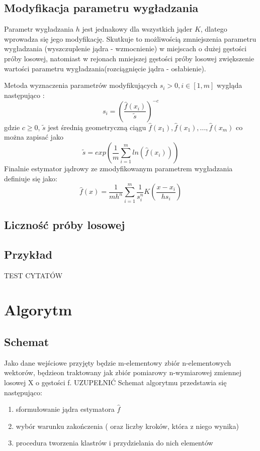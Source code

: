 \subsection{Modyfikacja parametru wygładzania}
\label{subsec:modyfikacje_h}
Parametr wygładzania $h$ jest jednakowy dla wszystkich jąder $K$, dlatego wprowadza się jego modyfikację. Skutkuje to możliwością zmniejszenia parametru wygładzania (wyszczuplenie jądra - wzmocnienie) w miejscach o dużej gęstości próby losowej, natomiast w rejonach mniejszej gęstości próby losowej zwiększenie wartości parametru wygładzania(rozciągnięcie jądra - osłabienie).

Metoda wyznaczenia parametrów modyfikujących $s_i>0, i \in [1, m]$ wygląda następująco :
\begin{equation}
s_i= {(\frac{\hat{f}(x_i)}{\tilde{s}})}^{-c}
\end{equation}
gdzie $c \geq 0$, $\tilde{s}$ jest średnią geometryczną ciągu $\hat{f}(x_1), \hat{f}(x_1), ..., \hat{f}(x_m)$ co można zapisać jako
\begin{equation}
\tilde{s} = exp(\frac{1}{m} \displaystyle\sum_{i=1}^{m} ln(\hat{f}(x_i)) )
\end{equation} 
Finalnie estymator jądrowy ze zmodyfikowanym parametrem wygładzania definiuje się jako:
\begin{equation}
\label{eq:est_mod}
\hat{f}(x)=\frac{1}{mh^n} \displaystyle \sum_{i=1}^{m} \frac{1}{s_i^n} K(\frac{x-x_i}{hs_i})
\end{equation}

\subsection{Liczność próby losowej}

\subsection{Przykład}

TEST CYTATÓW
\cite{Kul10}
\cite{Kul05}
\cite{Kul12}



\section{Algorytm}
\label{sec:algorytm}
\subsection{Schemat}
\label{subsec:schemat}
Jako dane wejściowe przyjęty będzie m-elementowy zbiór n-elementowych wektorów, będzieon traktowany jak zbiór pomiarowy n-wymiarowej zmiennej losowej X o gęstości f. UZUPEŁNIĆ
Schemat algorytmu przedstawia się następująco:
\begin{enumerate}
\item sformułowanie jądra estymatora $\hat{f}$
\item wybór warunku zakończenia ( oraz liczby kroków, która z niego wynika)
\item procedura tworzenia klastrów i przydzielania do nich elementów
\end{enumerate}

